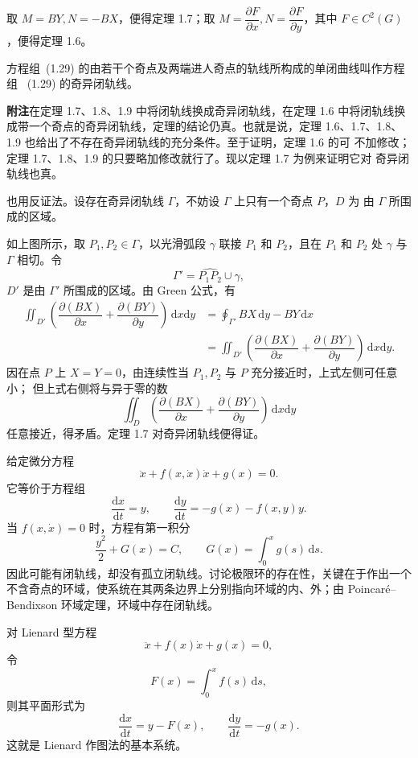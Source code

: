 取 $M=BY,N=-BX$，便得定理 1.7；取
$M=\dfrac{\partial F}{\partial x},N=\dfrac{\partial F}{\partial y}$，其中
$F\in C^2(G)$，便得定理 1.6。

方程组~(1.29) 的由若干个奇点及两端进人奇点的轨线所构成的单闭曲线叫作方程组
~(1.29) 的奇异闭轨线。

\noindent\textbf{附注}\quad 在定理 1.7、1.8、1.9 中将闭轨线换成奇异闭轨线，在定理
1.6 中将闭轨线换成带一个奇点的奇异闭轨线，定理的结论仍真。也就是说，定理
1.6、1.7、1.8、1.9 也给出了不存在奇异闭轨线的充分条件。至于证明，定理 1.6 的可
不加修改；定理 1.7、1.8、1.9 的只要略加修改就行了。现以定理 1.7 为例来证明它对
奇异闭轨线也真。

也用反证法。设存在奇异闭轨线 $\Gamma$，不妨设 $\Gamma$ 上只有一个奇点 $P$，$D$ 为
由 $\Gamma$ 所围成的区域。


如上图所示，取 $P_1,P_2\in\Gamma$，以光滑弧段 $\gamma$ 联接 $P_1$ 和 $P_2$，且在
$P_1$ 和 $P_2$ 处 $\gamma$ 与 $\Gamma$ 相切。令
\[
  \Gamma'=\widehat{P_1P_2}\cup\gamma,
\]
$D'$ 是由 $\Gamma'$ 所围成的区域。由 Green 公式，有
\[
\begin{aligned}
  \iint_{D'}\left(\dfrac{\partial(BX)}{\partial x}
  +\dfrac{\partial(BY)}{\partial y}\right)\,\mathrm{d}x\mathrm{d}y
  &=\oint_{\Gamma'}BX\,\mathrm{d}y-BY\,\mathrm{d}x\\
  &=\iint_{D'}\left(\dfrac{\partial(BX)}{\partial x}
  +\dfrac{\partial(BY)}{\partial y}\right)\,\mathrm{d}x\mathrm{d}y.
\end{aligned}
\]
因在点 $P$ 上 $X=Y=0$，由连续性当 $P_1,P_2$ 与 $P$ 充分接近时，上式左侧可任意小；
但上式右侧将与异于零的数
\[
  \iint_D\left(\dfrac{\partial(BX)}{\partial x}
  +\dfrac{\partial(BY)}{\partial y}\right)\,\mathrm{d}x\mathrm{d}y
\]
任意接近，得矛盾。定理 1.7 对奇异闭轨线便得证。

\iffalse

给定微分方程
\[
  \ddot{x}+f(x,\dot{x})\dot{x}+g(x)=0. \tag{1.1}
\]
它等价于方程组
\[
  \dfrac{\mathrm{d}x}{\mathrm{d}t}=y,\qquad
  \dfrac{\mathrm{d}y}{\mathrm{d}t}=-g(x)-f(x,y)y. \tag{1.2}
\]
当 $f(x,\dot{x})=0$ 时，方程有第一积分
\[
  \dfrac{y^2}{2}+G(x)=C,\qquad G(x)=\int_0^xg(s)\,\mathrm{d}s. \tag{1.3}
\]
因此可能有闭轨线，却没有孤立闭轨线。讨论极限环的存在性，关键在于作出一个
不含奇点的环域，使系统在其两条边界上分别指向环域的内、外；由
Poincar\'e--Bendixson 环域定理，环域中存在闭轨线。


对 Lienard 型方程
\[
  \ddot{x}+f(x)\dot{x}+g(x)=0,
\]
令
\[
  F(x)=\int_0^xf(s)\,\mathrm{d}s,
\]
则其平面形式为
\[
  \dfrac{\mathrm{d}x}{\mathrm{d}t}=y-F(x),\qquad
  \dfrac{\mathrm{d}y}{\mathrm{d}t}=-g(x). \tag{1.4}
\]
这就是 Lienard 作图法的基本系统。

